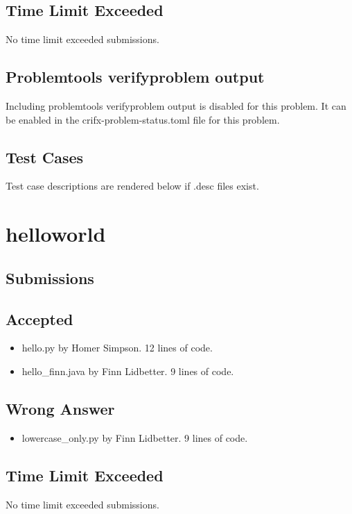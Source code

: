 \documentclass{article}%
\begin{document}
%
\subsection{Time Limit Exceeded}%
\label{subsec:TimeLimitExceeded}%
No time limit exceeded submissions.%

%
\subsection{Problemtools verifyproblem output}%
\label{subsec:Problemtoolsverifyproblemoutput}%
Including problemtools verifyproblem output is disabled for this problem. It can be enabled in the crifx{-}problem{-}status.toml file for this problem.

%
\subsection{Test Cases}%
\label{subsec:TestCases}%
Test case descriptions are rendered below if .desc files exist.%

%
\newpage%
\section{helloworld}%
\label{sec:helloworld}%
\subsection{Submissions}%
\label{subsec:Submissions}%
\subsection{Accepted}%
\label{subsec:Accepted}%
\begin{itemize}%
\item%
hello.py by Homer Simpson. 12 lines of code.%
\item%
hello\_finn.java by Finn Lidbetter. 9 lines of code.%
\end{itemize}

%
\subsection{Wrong Answer}%
\label{subsec:WrongAnswer}%
\begin{itemize}%
\item%
lowercase\_only.py by Finn Lidbetter. 9 lines of code.%
\end{itemize}

%
\subsection{Time Limit Exceeded}%
\label{subsec:TimeLimitExceeded}%
No time limit exceeded submissions.%
\end{document}
